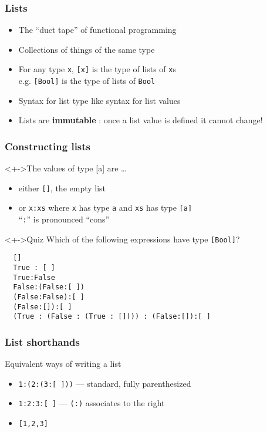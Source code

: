 \documentclass{beamer}
\begin{document}
\begin{frame}
  \frametitle{Lists}
  \begin{itemize}
  \item The “duct tape” of functional programming
  \item Collections of things of the same type 
  \item 
    For any type \texttt{x}, \texttt{[x]} is the type of lists of \texttt{x}s
    \\ e.g. \texttt{[Bool]} is the type of lists of \texttt{Bool}
  \item Syntax for list type like syntax for list values
  \item Lists are \textbf{immutable} : once a list value is defined it cannot change!
  \end{itemize}
\end{frame}
\begin{frame}[fragile]
  \frametitle{Constructing lists}
  \begin{block}<+->{The values of type [a] are \dots}
    \begin{itemize}
    \item either \texttt{[]}, the empty list
    \item or \texttt{x:xs} where \texttt{x} has type \texttt{a} and
      \texttt{xs} has type \texttt{[a]} \\
      ``\texttt{:}'' is pronounced ``cons''
    \end{itemize}
  \end{block}
  \begin{alertblock}<+->{Quiz}
    Which of the following expressions have type \texttt{[Bool]}?
\begin{verbatim}
  []
  True : [ ]
  True:False
  False:(False:[ ])
  (False:False):[ ]
  (False:[]):[ ]
  (True : (False : (True : []))) : (False:[]):[ ]
\end{verbatim}
  \end{alertblock}
\end{frame}
\begin{frame}
  \frametitle{List shorthands}
  \begin{block}{Equivalent ways of writing a list}
    \begin{itemize}
    \item \texttt{1:(2:(3:[ ]))}  --- standard, fully parenthesized
    \item \texttt{1:2:3:[ ]} --- \texttt{(:)} associates to the right
    \item \texttt{[1,2,3]}
    \end{itemize}
  \end{block}
\end{frame}
\end{document}
